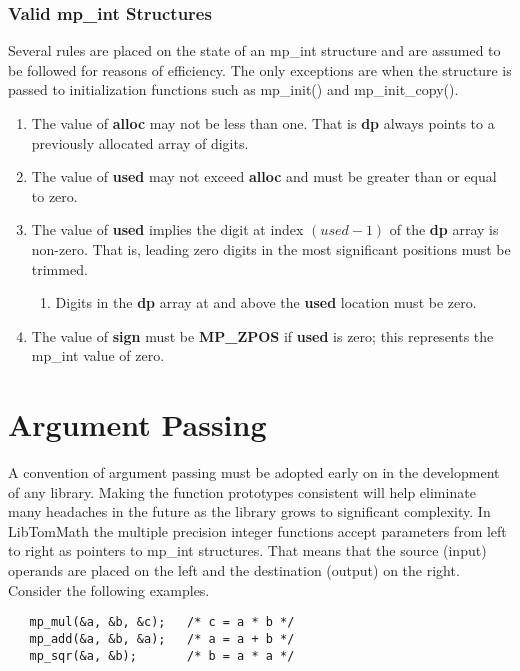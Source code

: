 \documentclass[b5paper]{book}
\begin{document}
\subsubsection{Valid mp\_int Structures}
Several rules are placed on the state of an mp\_int structure and are assumed to be followed for reasons of efficiency.  
The only exceptions are when the structure is passed to initialization functions such as mp\_init() and mp\_init\_copy().

\begin{enumerate}
\item The value of \textbf{alloc} may not be less than one.  That is \textbf{dp} always points to a previously allocated
array of digits.
\item The value of \textbf{used} may not exceed \textbf{alloc} and must be greater than or equal to zero.
\item The value of \textbf{used} implies the digit at index $(used - 1)$ of the \textbf{dp} array is non-zero.  That is, 
leading zero digits in the most significant positions must be trimmed.
   \begin{enumerate}
   \item Digits in the \textbf{dp} array at and above the \textbf{used} location must be zero.
   \end{enumerate}
\item The value of \textbf{sign} must be \textbf{MP\_ZPOS} if \textbf{used} is zero; 
this represents the mp\_int value of zero.
\end{enumerate}

\section{Argument Passing}
A convention of argument passing must be adopted early on in the development of any library.  Making the function 
prototypes consistent will help eliminate many headaches in the future as the library grows to significant complexity.  
In LibTomMath the multiple precision integer functions accept parameters from left to right as pointers to mp\_int 
structures.  That means that the source (input) operands are placed on the left and the destination (output) on the right.   
Consider the following examples.

\begin{verbatim}
   mp_mul(&a, &b, &c);   /* c = a * b */
   mp_add(&a, &b, &a);   /* a = a + b */
   mp_sqr(&a, &b);       /* b = a * a */
\end{verbatim}
\end{document}
